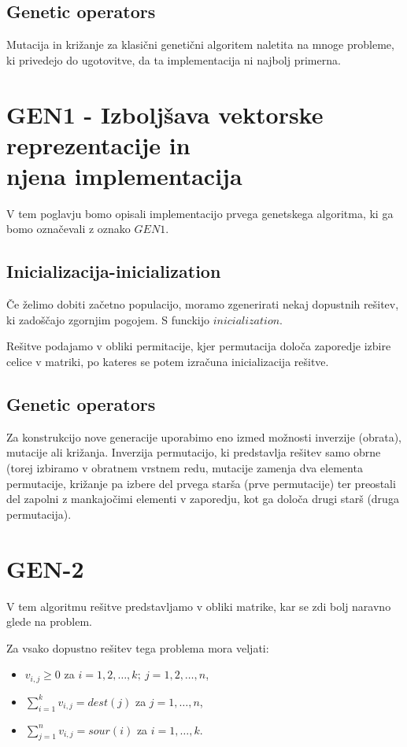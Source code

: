 \documentclass[12pt,a4paper,twoside]{article}
\theoremstyle{definition} %
\theoremstyle{plain} %
\numberwithin{equation}{section}  %
\begin{document}
\subsection{Genetic operators}

Mutacija in križanje za klasični genetični algoritem naletita na mnoge probleme, ki privedejo do ugotovitve, da ta implementacija ni najbolj primerna.

\section{GEN1 - Izboljšava vektorske reprezentacije in \\ njena implementacija}

V tem poglavju bomo opisali implementacijo prvega genetskega algoritma, ki ga bomo označevali z oznako $GEN1$.

\subsection{Inicializacija-inicialization}

Če želimo dobiti začetno populacijo, moramo zgenerirati nekaj dopustnih rešitev, ki zadoščajo zgornjim pogojem. S funckijo $inicialization$. 

\noindent Rešitve podajamo v obliki permitacije, kjer permutacija določa zaporedje izbire celice v matriki, po kateres se potem izračuna inicializacija rešitve.

\subsection{Genetic operators}

Za konstrukcijo nove generacije uporabimo eno izmed možnosti inverzije (obrata), mutacije ali križanja. Inverzija permutacijo, ki predstavlja rešitev samo obrne (torej izbiramo v obratnem vrstnem redu, mutacije zamenja dva elementa permutacije, križanje pa izbere del prvega starša (prve permutacije) ter preostali del zapolni z mankajočimi elementi v zaporedju, kot ga določa drugi starš (druga permutacija).

\section{GEN-2}

V tem algoritmu rešitve predstavljamo v obliki matrike, kar se zdi bolj naravno glede na problem.

\noindent Za vsako dopustno rešitev tega problema mora veljati:
\begin{itemize}
\item $v_{i,j} \geq 0$ za $i=1, 2, \dots, k;~ j=1,2, \dots, n$,
\item $\sum\limits_{i=1}^{k} v_{i,j} = dest(j)$ za $j=1, \dots, n$,
\item $\sum\limits_{j=1}^{n} v_{i,j}= sour(i)$ za $i=1, \dots, k$.
\end{itemize}
\end{document}
